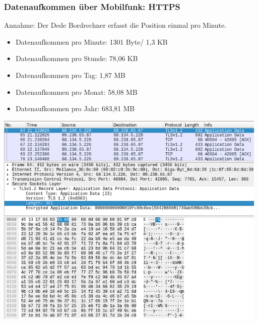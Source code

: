 \begin{frame}
  \frametitle{Datenaufkommen über Mobilfunk: HTTPS}
  Annahme: Der Dede Bordrechner erfasst die Position einmal pro Minute.
  \begin{itemize}
  \item Datenaufkommen pro Minute: 1301 Byte/ 1,3 KB
  \item Datenaufkommen pro Stunde: 78,06 KB
  \item Datenaufkommen pro Tag: 1,87 MB
  \item Datenaufkommen pro Monat: 58,08 MB
  \item Datenaufkommen pro Jahr: 683,81 MB
  \end{itemize}
  \includegraphics[width=0.5\paperwidth]{dede/dede-obc-wireshark-https-post}
\end{frame}
